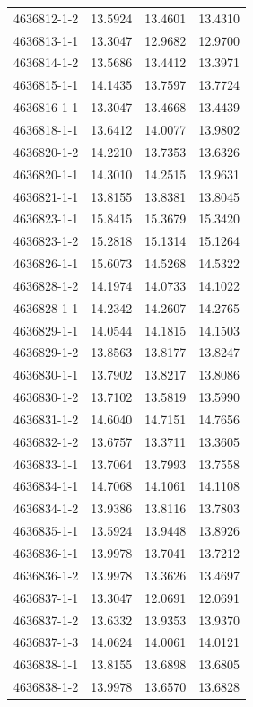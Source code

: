 \begin{longtable}{lrrr}
4636812-1-2 & 13.5924 & 13.4601 & 13.4310 \\
4636813-1-1 & 13.3047 & 12.9682 & 12.9700 \\
4636814-1-2 & 13.5686 & 13.4412 & 13.3971 \\
4636815-1-1 & 14.1435 & 13.7597 & 13.7724 \\
4636816-1-1 & 13.3047 & 13.4668 & 13.4439 \\
4636818-1-1 & 13.6412 & 14.0077 & 13.9802 \\
4636820-1-2 & 14.2210 & 13.7353 & 13.6326 \\
4636820-1-1 & 14.3010 & 14.2515 & 13.9631 \\
4636821-1-1 & 13.8155 & 13.8381 & 13.8045 \\
4636823-1-1 & 15.8415 & 15.3679 & 15.3420 \\
4636823-1-2 & 15.2818 & 15.1314 & 15.1264 \\
4636826-1-1 & 15.6073 & 14.5268 & 14.5322 \\
4636828-1-2 & 14.1974 & 14.0733 & 14.1022 \\
4636828-1-1 & 14.2342 & 14.2607 & 14.2765 \\
4636829-1-1 & 14.0544 & 14.1815 & 14.1503 \\
4636829-1-2 & 13.8563 & 13.8177 & 13.8247 \\
4636830-1-1 & 13.7902 & 13.8217 & 13.8086 \\
4636830-1-2 & 13.7102 & 13.5819 & 13.5990 \\
4636831-1-2 & 14.6040 & 14.7151 & 14.7656 \\
4636832-1-2 & 13.6757 & 13.3711 & 13.3605 \\
4636833-1-1 & 13.7064 & 13.7993 & 13.7558 \\
4636834-1-1 & 14.7068 & 14.1061 & 14.1108 \\
4636834-1-2 & 13.9386 & 13.8116 & 13.7803 \\
4636835-1-1 & 13.5924 & 13.9448 & 13.8926 \\
4636836-1-1 & 13.9978 & 13.7041 & 13.7212 \\
4636836-1-2 & 13.9978 & 13.3626 & 13.4697 \\
4636837-1-1 & 13.3047 & 12.0691 & 12.0691 \\
4636837-1-2 & 13.6332 & 13.9353 & 13.9370 \\
4636837-1-3 & 14.0624 & 14.0061 & 14.0121 \\
4636838-1-1 & 13.8155 & 13.6898 & 13.6805 \\
4636838-1-2 & 13.9978 & 13.6570 & 13.6828 \\

\end{longtable}
